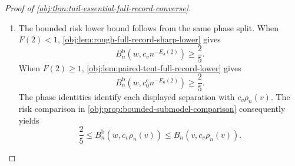 \documentclass[11pt]{article}
\begin{document}
\begin{proof}[Proof of \cref{obj:thm:tail-essential-full-record-converse}]
\begin{enumerate}
In the rough phase, \cref{obj:lem:rough-full-record-sharp-lower} supplies
\[
\begin{gathered}
\operatorname{supp}_+(\pi^{\mathrm b}_{0,n,v})
\subseteq H_0^{\mathrm b}(w),\\
\operatorname{supp}_+(\pi^{\mathrm b}_{1,n,v})
\subseteq
\{P\in\mathcal M_w^{\mathrm b}:
c_vn^{-E_4(2)}\le d(P)<d_0\}.
\end{gathered}
\]
By the phase identity, \(\rho_n(v)=n^{-E_4(2)}\).
The model inclusion of \cref{obj:prop:bounded-submodel-comparison}
preserves the effect, and the null constancy condition is the same in
both models. Hence
\[
\begin{gathered}
\operatorname{supp}_+(\pi^{\mathrm b}_{0,n,v})\subseteq H_0(v),\\
\operatorname{supp}_+(\pi^{\mathrm b}_{1,n,v})
\subseteq
\{P\in\mathcal M_v:c_v\rho_n(v)\le d(P)\}.
\end{gathered}
\]

In the complementary phase \(F(2)\ge1\), the selected bounded priors are
the signed-binary paired-tent priors. To identify their null support,
define the balanced deterministic zero-effect law by
\[
P_{\mathrm{zero}}(dx,dA,dy)
=
\lambda(dx)\,
\frac{\delta_0+\delta_1}{2}(dA)\,
\delta_0(dy).
\]
It has propensity \(1/2\), baseline mean zero, and effect zero. Its
smoothness conditions hold because these functions are constant, and
its raw moment is zero. Its signed-binary conversion from
\cref{obj:prop:bounded-submodel-comparison} is
\[
P_{\mathrm{zero}}^{\mathrm{bin}}(dx,dA,dy)
=
\lambda(dx)\,
\frac{\delta_0+\delta_1}{2}(dA)\,
\frac{\delta_{-1}+\delta_1}{2}(dy).
\]
This conversion preserves the means and effect, and its conditional
second moment is one. Thus
\(P_{\mathrm{zero}}^{\mathrm{bin}}\in H_0(v)\).
Every selected null sign configuration gives precisely this law, so
\[
\operatorname{supp}_+(\pi^{\mathrm b}_{0,n,v})
\subseteq\{P_{\mathrm{zero}}^{\mathrm{bin}}\}\subseteq H_0(v).
\]
For the alternatives,
\cref{obj:lem:paired-tent-full-record-lower} and
\cref{obj:prop:bounded-submodel-comparison} give original-model
membership and
\[
d(P)\ge c_0^{\mathrm e}n^{-E_0(2)}
=c_v\rho_n(v)
\qquad
(P\in\operatorname{supp}_+(\pi^{\mathrm b}_{1,n,v})).
\]
This proves the original-model support conclusions in both phases.

\item
The bounded risk lower bound follows from the same phase split.
When \(F(2)<1\),
\cref{obj:lem:rough-full-record-sharp-lower} gives
\[
B_n^{\mathrm b}(w,c_vn^{-E_4(2)})\ge\frac25.
\]
When \(F(2)\ge1\),
\cref{obj:lem:paired-tent-full-record-lower} gives
\[
B_n^{\mathrm b}(w,c_0^{\mathrm e}n^{-E_0(2)})\ge\frac25.
\]
The phase identities identify each displayed separation with
\(c_v\rho_n(v)\). The risk comparison in
\cref{obj:prop:bounded-submodel-comparison} consequently yields
\[
\frac25
\le B_n^{\mathrm b}(w,c_v\rho_n(v))
\le B_n(v,c_v\rho_n(v)).
\]


\end{enumerate}
\end{proof}
\end{document}
